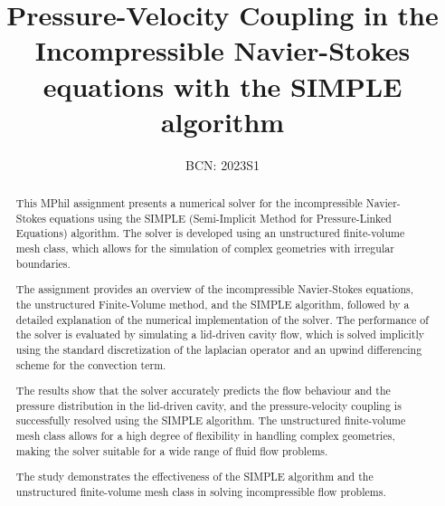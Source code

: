 \documentclass[final,3p,times,twocolumn]{elsarticle}
\begin{document}
\begin{frontmatter}



\title{Pressure-Velocity Coupling in the Incompressible Navier-Stokes equations with the SIMPLE algorithm}


\author{BCN: 2023S1}

\address{Cavendish Laboratory, Department of Physics, J J Thomson
  Avenue, Cambridge. CB3 0HE}

\begin{abstract}
This MPhil assignment presents a numerical solver for the incompressible Navier-Stokes equations using the SIMPLE (Semi-Implicit Method for Pressure-Linked Equations) algorithm. The solver is developed using an unstructured finite-volume mesh class, which allows for the simulation of complex geometries with irregular boundaries.

The assignment provides an overview of the incompressible Navier-Stokes equations, the unstructured Finite-Volume method, and the SIMPLE algorithm, followed by a detailed explanation of the numerical implementation of the solver. The performance of the solver is evaluated by simulating a lid-driven cavity flow, which is solved implicitly using the standard discretization of the laplacian operator and an upwind differencing scheme for the convection term.

The results show that the solver accurately predicts the flow behaviour and the pressure distribution in the lid-driven cavity, and the pressure-velocity coupling is successfully resolved using the SIMPLE algorithm. The unstructured finite-volume mesh class allows for a high degree of flexibility in handling complex geometries, making the solver suitable for a wide range of fluid flow problems.

The study demonstrates the effectiveness of the SIMPLE algorithm and the unstructured finite-volume mesh class in solving incompressible flow problems. 
\end{abstract}

\end{frontmatter}
\end{document}
